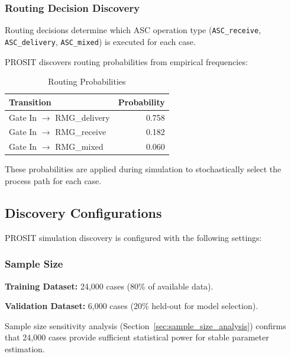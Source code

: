         \subsubsection{Routing Decision Discovery}
        
        Routing decisions determine which ASC operation type (\texttt{ASC\_receive}, \texttt{ASC\_delivery}, \texttt{ASC\_mixed}) is executed for each case.
        
        PROSIT discovers routing probabilities from empirical frequencies:
        
        \begin{table}[h]
        \centering
        \caption{Routing Probabilities}
        \label{tab:routing_probs}
        \begin{tabular}{lr}
        \toprule
        \textbf{Transition} & \textbf{Probability} \\
        \midrule
        Gate In $\rightarrow$ RMG\_delivery & 0.758 \\
        Gate In $\rightarrow$ RMG\_receive  & 0.182 \\
        Gate In $\rightarrow$ RMG\_mixed    & 0.060 \\
        \bottomrule
        \end{tabular}
        \end{table}
        
        These probabilities are applied during simulation to stochastically select the process path for each case.

    \subsection{Discovery Configurations}
    
    PROSIT simulation discovery is configured with the following settings:

        \subsubsection{Sample Size}
        
        \textbf{Training Dataset:} 24,000 cases (80\% of available data).
        
        \textbf{Validation Dataset:} 6,000 cases (20\% held-out for model selection).
        
        Sample size sensitivity analysis (Section~\ref{sec:sample_size_analysis}) confirms that 24,000 cases provide sufficient statistical power for stable parameter estimation.
        
